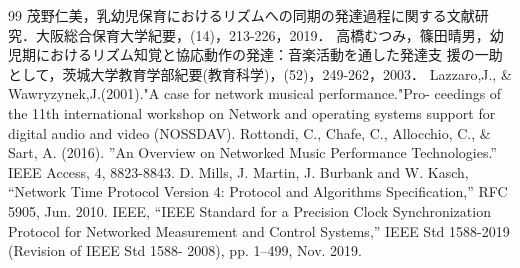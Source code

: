\begin{thebibliography}{99}
 茂野仁美，乳幼児保育におけるリズムへの同期の発達過程に関する文献研究．大阪総合保育大学紀要，(14)，213-226，2019．
 高橋むつみ，篠田晴男，幼児期におけるリズム知覚と協応動作の発達：音楽活動を通した発達支
援の一助として，茨城大学教育学部紀要(教育科学)，(52)，249-262，2003．
 Lazzaro,J., \& Wawryzynek,J.(2001)."A case for network musical performance."Pro-
ceedings of the 11th international workshop on Network and operating systems support for
digital audio and video (NOSSDAV).
 Rottondi, C., Chafe, C., Allocchio, C., \& Sart, A. (2016). ”An Overview on Networked
Music Performance Technologies.” IEEE Access, 4, 8823-8843.
 D. Mills, J. Martin, J. Burbank and W. Kasch, “Network Time Protocol Version 4:
Protocol and Algorithms Specification,” RFC 5905, Jun. 2010.
 IEEE, “IEEE Standard for a Precision Clock Synchronization Protocol for Networked
Measurement and Control Systems,” IEEE Std 1588-2019 (Revision of IEEE Std 1588-
2008), pp. 1–499, Nov. 2019.
\end{thebibliography}
